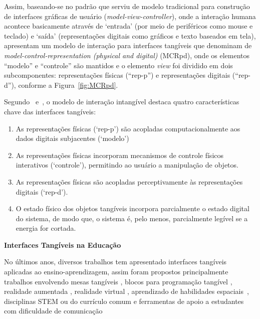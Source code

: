 Assim, baseando-se no padrão que serviu de modelo tradicional para construção de interfaces gráficas de usuário (\textit{model-view-controller}), onde a interação humana acontece basicamente através de `entrada' (por meio de periféricos como mouse e teclado) e `saída' (representações digitais como gráficos e texto baseados em tela), \cite{ullmer:2000} apresentam um modelo de interação para interfaces tangíveis que denominam de \textit{model-control-representation (physical and digital)} (MCRpd), onde os elementos ``modelo'' e ``controle'' são mantidos e o elemento \textit{view} foi dividido em dois subcomponentes: representações físicas (``rep-p'') e representações digitais (``rep-d''), conforme a Figura~\ref{fig:MCRpd}.

Segundo~\cite{ullmer:2000} e~\cite{zhou:2015}, o modelo de interação intangível destaca quatro características chave das interfaces tangíveis: 
\begin{enumerate}
	\item As representações físicas (`rep-p') são acopladas computacionalmente aos dados digitais subjacentes (`modelo')
	\item As representações físicas incorporam mecanismos de controle físicos interativos (`controle'), permitindo ao usuário a manipulação de objetos.
	\item As representações físicas são acopladas perceptivamente às representações digitais (`rep-d').
	\item O estado físico dos objetos tangíveis incorpora parcialmente o estado digital do sistema, de modo que, o sistema é, pelo menos, parcialmente legível se a energia for cortada.
\end{enumerate}


\textbf{Interfaces Tangíveis na Educação}

No últimos anos, diversos trabalhos tem apresentado interfaces tangíveis aplicadas ao ensino-aprendizagem, assim foram propostos principalmente trabalhos envolvendo mesas tangíveis \citep{mendoza:2019, ishii:1997}, blocos para programação tangível \citep{panaggio:2019, carbajal:2018, leite:2017, viana:2018}, realidade aumentada \citep{imamura:2018}, realidade virtual \citep{gluz:2018, lopes:2018}, aprendizado de habilidades espaciais~\citep{ha:2018}, disciplinas STEM \citep{Azad:2016} ou do currículo comum \citep{Blikstein:2012, Blikstein2016} e ferramentas de apoio a estudantes com dificuldade de comunicação \citep{moreira:2018, moreira:2018b}

